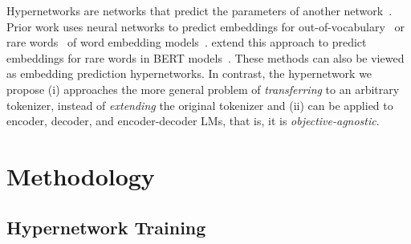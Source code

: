 \documentclass{article}
\begin{document}
Hypernetworks are networks that predict the parameters of another network~\citep{ha2017hypernetworks}. Prior work uses neural networks to predict embeddings for out-of-vocabulary~\citep{pinter2017mimicking} or rare words~\citep{schick-schutze-2019-attentive} of word embedding models~\citep{mikolov2013efficient}. \citet{schick-schutze-2020-bertram} extend this approach to predict embeddings for rare words in BERT models~\citep{devlin-etal-2019-bert}. These methods can also be viewed as embedding prediction hypernetworks. In contrast, the hypernetwork we propose (i) approaches the more general problem of \textit{transferring} to an arbitrary tokenizer, instead of \textit{extending} the original tokenizer and (ii) can be applied to encoder, decoder, and encoder-decoder LMs, that is, it is \textit{objective-agnostic}.

\section{Methodology}
\label{sec:method}

\subsection{Hypernetwork Training}
\end{document}
